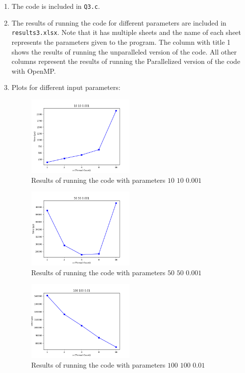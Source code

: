 \documentclass[12pt]{article}
\begin{document}
	\begin{enumerate}[label=\alph*.]
		\item 
		The code is included in \Verb+Q3.c+.
		
		\item 
		The results of running the code for different parameters are included in \Verb+results3.xlsx+. Note that it has multiple sheets and the name of each sheet represents the parameters given to the program. The column with title 1 shows the results of running the unparalleled version of the code. All other columns represent the results of running the Parallelized version of the code with OpenMP.
		
		\item
		Plots for different input parameters:
		
		\begin{figure}[H]
			\centering
			\includegraphics[width=0.5\textwidth]{./images/Q3/10100001.png}	
			\cprotect\caption{Results of running the code with parameters $10$ $10$ $0.001$}
			\label{fig:1}
		\end{figure}
		
		\begin{figure}[H]
			\centering
			\includegraphics[width=0.5\textwidth]{./images/Q3/50500001.png}	
			\cprotect\caption{Results of running the code with parameters $50$ $50$ $0.001$}
			\label{fig:2}
		\end{figure}
		
		\begin{figure}[H]
			\centering
			\includegraphics[width=0.5\textwidth]{./images/Q3/100100001.png}	
			\cprotect\caption{Results of running the code with parameters $100$ $100$ $0.01$}
			\label{fig:3}
		\end{figure}
		

\end{enumerate}
\end{document}
